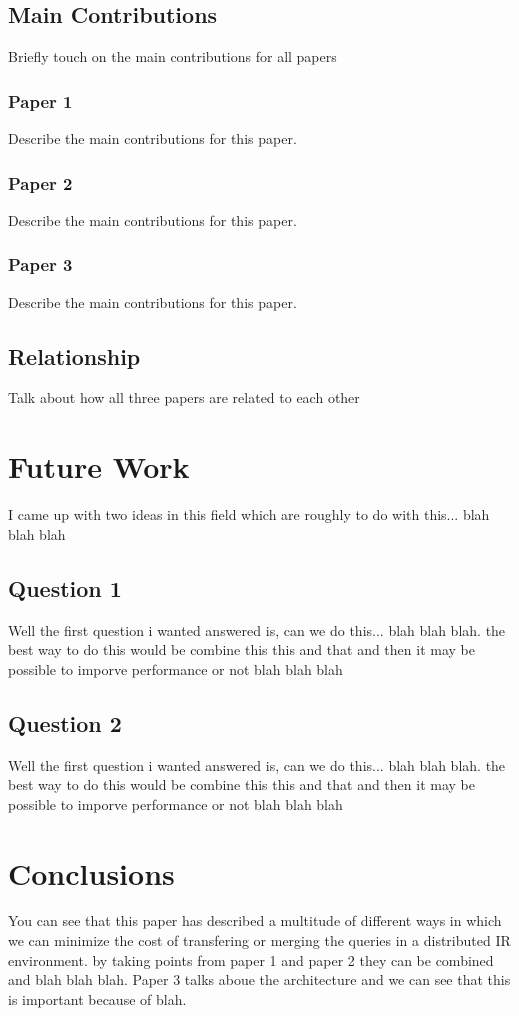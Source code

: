 \documentclass{acm_proc_article-sp}
\begin{document}
\subsection{Main Contributions}
Briefly touch on the main contributions for all papers
\subsubsection{Paper 1}
Describe the main contributions for this paper.

\subsubsection{Paper 2}
Describe the main contributions for this paper.

\subsubsection{Paper 3}
Describe the main contributions for this paper.

\subsection{Relationship}
Talk about how all three papers are related to each other

\section{Future Work}
I came up with two ideas in this field which are roughly to do with this... blah blah blah

\subsection{Question 1}
Well the first question i wanted answered is, can we do this... blah blah blah. the best way to do this would be combine this this and that and then it may be possible to imporve performance or not blah blah blah

\subsection{Question 2}
Well the first question i wanted answered is, can we do this... blah blah blah. the best way to do this would be combine this this and that and then it may be possible to imporve performance or not blah blah blah

\section{Conclusions}
You can see that this paper has described a multitude of different ways in which we can minimize the cost of transfering or merging the queries in a distributed IR environment. by taking points from paper 1 and paper 2 they can be combined and blah blah blah. Paper 3 talks aboue the architecture and we can see that this is important because of blah.
\end{document}
